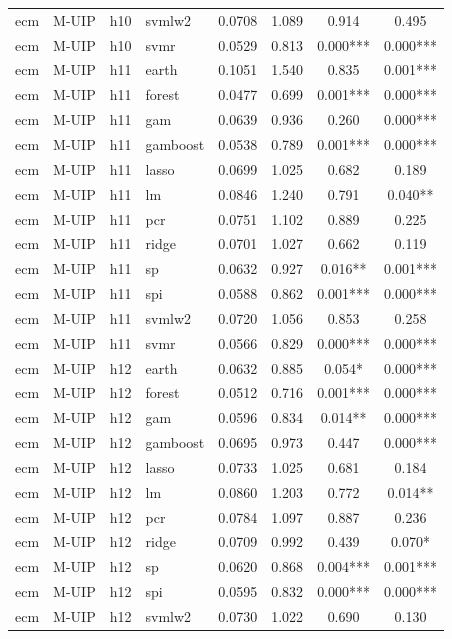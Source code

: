 \begin{ThreePartTable}
\begin{longtable}[t]{llclcccc}
ecm & M-UIP & h10 & svmlw2 & 0.0708 & 1.089 & 0.914 & 0.495\\
ecm & M-UIP & h10 & svmr & 0.0529 & 0.813 & 0.000*** & 0.000***\\
\addlinespace
ecm & M-UIP & h11 & earth & 0.1051 & 1.540 & 0.835 & 0.001***\\
ecm & M-UIP & h11 & forest & 0.0477 & 0.699 & 0.001*** & 0.000***\\
ecm & M-UIP & h11 & gam & 0.0639 & 0.936 & 0.260 & 0.000***\\
ecm & M-UIP & h11 & gamboost & 0.0538 & 0.789 & 0.001*** & 0.000***\\
ecm & M-UIP & h11 & lasso & 0.0699 & 1.025 & 0.682 & 0.189\\
ecm & M-UIP & h11 & lm & 0.0846 & 1.240 & 0.791 & 0.040**\\
ecm & M-UIP & h11 & pcr & 0.0751 & 1.102 & 0.889 & 0.225\\
ecm & M-UIP & h11 & ridge & 0.0701 & 1.027 & 0.662 & 0.119\\
ecm & M-UIP & h11 & sp & 0.0632 & 0.927 & 0.016** & 0.001***\\
ecm & M-UIP & h11 & spi & 0.0588 & 0.862 & 0.001*** & 0.000***\\
ecm & M-UIP & h11 & svmlw2 & 0.0720 & 1.056 & 0.853 & 0.258\\
ecm & M-UIP & h11 & svmr & 0.0566 & 0.829 & 0.000*** & 0.000***\\
\addlinespace
ecm & M-UIP & h12 & earth & 0.0632 & 0.885 & 0.054* & 0.000***\\
ecm & M-UIP & h12 & forest & 0.0512 & 0.716 & 0.001*** & 0.000***\\
ecm & M-UIP & h12 & gam & 0.0596 & 0.834 & 0.014** & 0.000***\\
ecm & M-UIP & h12 & gamboost & 0.0695 & 0.973 & 0.447 & 0.000***\\
ecm & M-UIP & h12 & lasso & 0.0733 & 1.025 & 0.681 & 0.184\\
ecm & M-UIP & h12 & lm & 0.0860 & 1.203 & 0.772 & 0.014**\\
ecm & M-UIP & h12 & pcr & 0.0784 & 1.097 & 0.887 & 0.236\\
ecm & M-UIP & h12 & ridge & 0.0709 & 0.992 & 0.439 & 0.070*\\
ecm & M-UIP & h12 & sp & 0.0620 & 0.868 & 0.004*** & 0.001***\\
ecm & M-UIP & h12 & spi & 0.0595 & 0.832 & 0.000*** & 0.000***\\
ecm & M-UIP & h12 & svmlw2 & 0.0730 & 1.022 & 0.690 & 0.130\\

\end{longtable}
\end{ThreePartTable}
